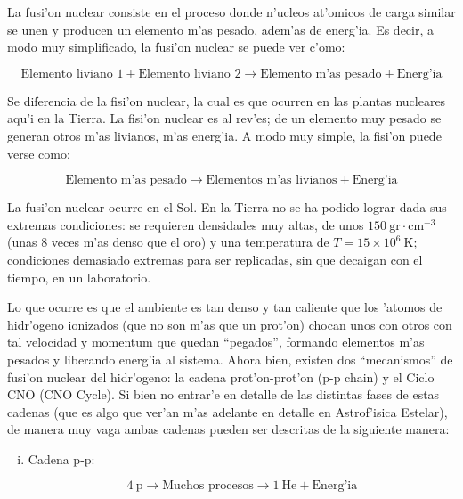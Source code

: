 \documentclass{article}
\begin{document}
\begin{enumerate}[a)]
La fusi'on nuclear consiste en el proceso donde n'ucleos at'omicos de carga similar se unen y producen un elemento m'as pesado, adem'as de energ'ia. Es decir, a modo muy simplificado, la fusi'on nuclear se puede ver c'omo:

\begin{equation}
\text{Elemento liviano 1} + \text{Elemento liviano 2} \rightarrow \text{Elemento m'as pesado} + \text{Energ'ia}
\end{equation}

Se diferencia de la fisi'on nuclear, la cual es que ocurren en las plantas nucleares aqu'i en la Tierra. La fisi'on nuclear es al rev'es; de un elemento muy pesado se generan otros m'as livianos, m'as energ'ia. A modo muy simple, la fisi'on puede verse como:

\begin{equation}
\text{Elemento m'as pesado} \rightarrow \text{Elementos m'as livianos} + \text{Energ'ia}
\end{equation}

La fusi'on nuclear ocurre en el Sol. En la Tierra no se ha podido lograr dada sus extremas condiciones: se requieren densidades muy altas, de unos $150 \ \text{gr} \cdot \text{cm}^{-3}$ (unas 8 veces m'as denso que el oro) y una temperatura de $T = 15 \times 10^{6} \ \text{K}$; condiciones demasiado extremas para ser replicadas, sin que decaigan con el tiempo, en un laboratorio. 

Lo que ocurre es que el ambiente es tan denso y tan caliente que los 'atomos de hidr'ogeno ionizados (que no son m'as que un prot'on) chocan unos con otros con tal velocidad y momentum que quedan ``pegados'', formando elementos m'as pesados y liberando energ'ia al sistema. Ahora bien, existen dos ``mecanismos'' de fusi'on nuclear del hidr'ogeno: la cadena prot'on-prot'on (p-p chain) y el Ciclo CNO (CNO Cycle). Si bien no entrar'e en detalle de las distintas fases de estas cadenas (que es algo que ver'an m'as adelante en detalle en Astrof'isica Estelar), de manera muy vaga ambas cadenas pueden ser descritas de la siguiente manera:

\begin{enumerate} [i)]

\item Cadena p-p:

\begin{equation} \label{p-p_chain}
4 \ \text{p} \rightarrow \text{Muchos procesos} \rightarrow 1 \ \text{He} + \text{Energ'ia}
\end{equation}


\end{enumerate}
\end{enumerate}
\end{document}

